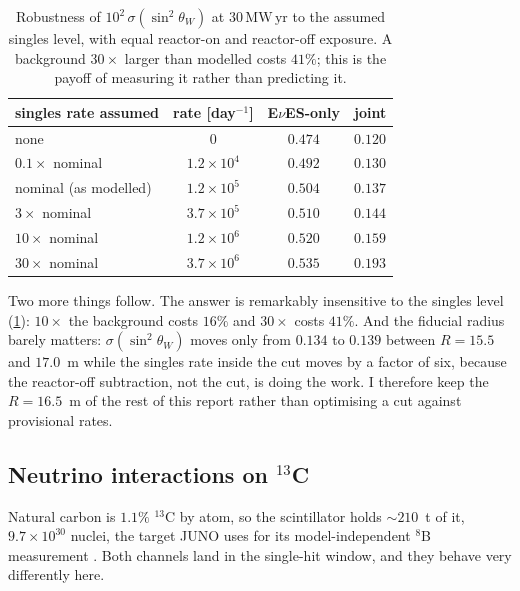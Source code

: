 \documentclass[aps,prd,superscriptaddress,nofootinbib,longbibliography,notitlepage,11pt]{revtex4-2}
\newcommand{\eves}{E$\nu$ES}
\newcommand{\sw}{\sin^2\theta_W}
\newcommand{\MWyr}{\mathrm{MW\,yr}}
\begin{document}
\begin{table}[t]\centering
\begin{tabular}{lccc}\toprule
singles rate assumed & rate [day$^{-1}$] & \eves{}-only & joint\\\midrule
none & $0$ & $0.474$ & $0.120$\\
$0.1\times$ nominal & $1.2\times10^4$ & $0.492$ & $0.130$\\
nominal (as modelled) & $1.2\times10^5$ & $0.504$ & $0.137$\\
$3\times$ nominal & $3.7\times10^5$ & $0.510$ & $0.144$\\
$10\times$ nominal & $1.2\times10^6$ & $0.520$ & $0.159$\\
$30\times$ nominal & $3.7\times10^6$ & $0.535$ & $0.193$\\
\bottomrule\end{tabular}
\caption{Robustness of $10^2\,\sigma(\sw)$ at $30\,\MWyr$ to the assumed singles level,
with equal reactor-on and reactor-off exposure.  A background $30\times$ larger than
modelled costs $41\%$; this is the payoff of measuring it rather than predicting it.}
\label{tab:onoff}
\end{table}

Two more things follow.  The answer is remarkably insensitive to the singles level
(\cref{tab:onoff}): $10\times$ the background costs $16\%$ and $30\times$ costs $41\%$.
And the fiducial radius barely matters: $\sigma(\sw)$ moves only from $0.134$ to $0.139$
between $R=15.5$ and $17.0$~m while the singles rate inside the cut moves by a factor of
six, because the reactor-off subtraction, not the cut, is doing the work.  I therefore
keep the $R=16.5$~m of the rest of this report rather than optimising a cut against
provisional rates.

\subsection{Neutrino interactions on $^{13}$C}
\label{sec:c13}
Natural carbon is $1.1\%$ $^{13}$C by atom, so the scintillator holds $\sim210$~t of it,
$9.7\times10^{30}$ nuclei, the target JUNO uses for its model-independent $^8$B measurement
\cite{Gavrikov:2025rlg}.  Both channels land in the single-hit window, and they behave very
differently here.
\end{document}
